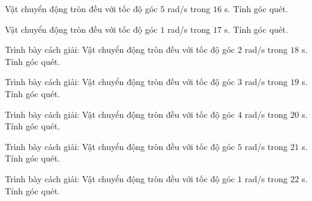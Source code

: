 \begin{ex}
Vật chuyển động tròn đều với tốc độ góc $5$ rad/s trong $16$ s. Tính góc quét.
\end{ex}

\begin{ex}
Vật chuyển động tròn đều với tốc độ góc $1$ rad/s trong $17$ s. Tính góc quét.
\end{ex}

\begin{bt}
Trình bày cách giải: Vật chuyển động tròn đều với tốc độ góc $2$ rad/s trong $18$ s. Tính góc quét.
\end{bt}

\begin{bt}
Trình bày cách giải: Vật chuyển động tròn đều với tốc độ góc $3$ rad/s trong $19$ s. Tính góc quét.
\end{bt}

\begin{bt}
Trình bày cách giải: Vật chuyển động tròn đều với tốc độ góc $4$ rad/s trong $20$ s. Tính góc quét.
\end{bt}

\begin{bt}
Trình bày cách giải: Vật chuyển động tròn đều với tốc độ góc $5$ rad/s trong $21$ s. Tính góc quét.
\end{bt}

\begin{bt}
Trình bày cách giải: Vật chuyển động tròn đều với tốc độ góc $1$ rad/s trong $22$ s. Tính góc quét.
\end{bt}

